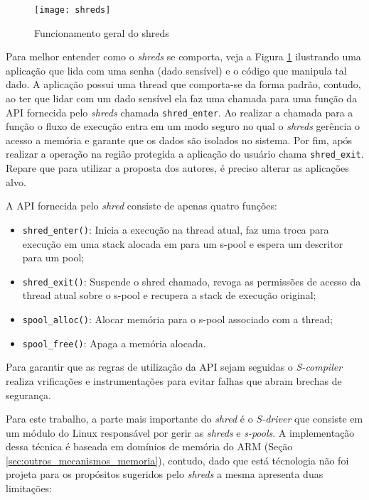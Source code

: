 \begin{figure}[!h]
  \centering
  \texttt{[image: shreds]} 
  \caption{Funcionamento geral do shreds}
  \label{fig:shreds}
\end{figure}


Para melhor entender como o \emph{shreds} se comporta, veja a Figura
\ref{fig:shreds} ilustrando uma aplicação que lida com uma senha (dado
sensível) e o código que manipula tal dado. A aplicação possui uma thread que
comporta-se da forma padrão, contudo, ao ter que lidar com um dado sensível ela
faz uma chamada para uma função da API fornecida pelo \emph{shreds} chamada
\texttt{shred\_enter}. Ao realizar a chamada para a função o fluxo de execução
entra em um modo seguro no qual o \emph{shreds} gerência o acesso a memória e
garante que os dados são isolados no sistema. Por fim, após realizar a operação
na região protegida a aplicação do usuário chama \texttt{shred\_exit}. Repare
que para utilizar a proposta dos autores, é preciso alterar as aplicações alvo.

A API fornecida pelo \emph{shred} consiste de apenas quatro funções:

\begin{itemize}
  \item \texttt{shred\_enter()}: Inicia a execução na thread atual, faz uma
        troca para execução em uma stack alocada em para um s-pool e espera um
        descritor para um pool;
  \item \texttt{shred\_exit()}: Suspende o shred chamado, revoga as permissões
        de acesso da thread atual sobre o s-pool e recupera a stack de execução
        original;
  \item \texttt{spool\_alloc()}: Alocar memória para o s-pool associado com a
        thread;
  \item \texttt{spool\_free()}: Apaga a memória alocada.
\end{itemize}

Para garantir que as regras de utilização da API sejam seguidas o
\emph{S-compiler} realiza vrificações e instrumentações para evitar falhas que
abram brechas de segurança.

Para este trabalho, a parte mais importante do \emph{shred} é o \emph{S-driver}
que consiste em um módulo do Linux responsável por gerir as \emph{shreds} e
\emph{s-pools}. A implementação dessa técnica é baseada em domínios de memória
do ARM (Seção \ref{sec:outros_mecanismos_memoria}), contudo, dado que está
técnologia não foi projeta para os propósitos sugeridos pelo \emph{shreds} a
mesma apresenta duas limitações:

